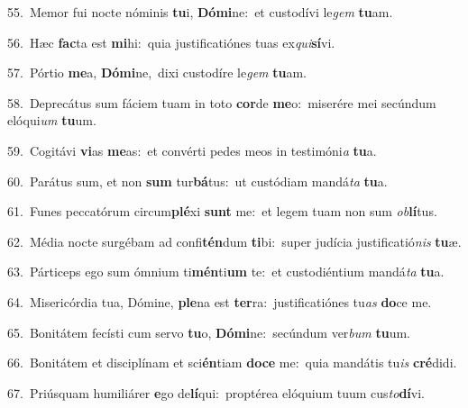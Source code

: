 {\numbfont\textcolor{\numbcolor}{55.}}~Memor fui nocte nóminis \textbf{tu}\-i, \textbf{Dó}\-\textbf{mi}ne:~\star et custodívi le\textit{gem} \textbf{tu}\-am.\par
{\numbfont\textcolor{\numbcolor}{56.}}~Hæc \textbf{fac}\-ta est \textbf{mi}\-hi:~\star quia justificatiónes tuas ex\-\textit{qui}\-\textbf{sí}vi.\par
{\numbfont\textcolor{\numbcolor}{57.}}~Pórtio \textbf{me}\-a, \textbf{Dó}\-\textbf{mi}ne,~\star dixi custodíre le\textit{gem} \textbf{tu}\-am.\par
{\numbfont\textcolor{\numbcolor}{58.}}~Deprecátus sum fáciem tuam in toto \textbf{cor}\-de \textbf{me}\-o:~\star miserére mei secúndum elóqui\textit{um} \textbf{tu}\-um.\par
{\numbfont\textcolor{\numbcolor}{59.}}~Cogitávi \textbf{vi}\-as \textbf{me}\-as:~\star et convérti pedes meos in testimóni\textit{a} \textbf{tu}\-a.\par
{\numbfont\textcolor{\numbcolor}{60.}}~Parátus sum, et non \textbf{sum} tur\-\textbf{bá}\-tus:~\star ut custódiam mandá\textit{ta} \textbf{tu}\-a.\par
{\numbfont\textcolor{\numbcolor}{61.}}~Funes peccatórum circum\-\textbf{plé}\-xi \textbf{sunt} me:~\star et legem tuam non sum \textit{ob}\-\textbf{lí}tus.\par
{\numbfont\textcolor{\numbcolor}{62.}}~Média nocte surgébam ad confi\-\textbf{tén}\-dum \textbf{ti}\-bi:~\star super judícia justificatió\textit{nis} \textbf{tu}\-æ.\par
{\numbfont\textcolor{\numbcolor}{63.}}~Párticeps ego sum ómnium ti\-\textbf{mén}\-ti\textbf{um} te:~\star et custodiéntium mandá\textit{ta} \textbf{tu}\-a.\par
{\numbfont\textcolor{\numbcolor}{64.}}~Misericórdia tua, Dómine, \textbf{ple}\-na est \textbf{ter}\-ra:~\star justificatiónes tu\textit{as} \textbf{do}\-ce me.\par
{\numbfont\textcolor{\numbcolor}{65.}}~Bonitátem fecísti cum servo \textbf{tu}\-o, \textbf{Dó}\-\textbf{mi}ne:~\star secúndum ver\textit{bum} \textbf{tu}\-um.\par
{\numbfont\textcolor{\numbcolor}{66.}}~Bonitátem et disciplínam et sci\-\textbf{én}\-tiam \textbf{do}\-\textbf{ce} me:~\star quia mandátis tu\textit{is} \textbf{cré}\-didi.\par
{\numbfont\textcolor{\numbcolor}{67.}}~Priúsquam humiliárer \textbf{e}\-go de\-\textbf{lí}\-qui:~\star proptérea elóquium tuum cus\-\textit{to}\-\textbf{dí}vi.\par
